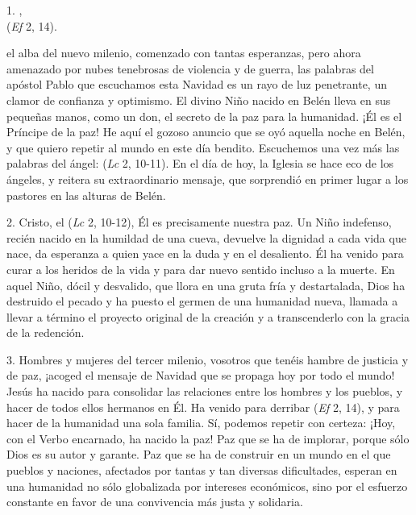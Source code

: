\begin{body}
	1. ,\\  (\emph{Ef} 2, 14).
	
	 el alba del nuevo milenio, comenzado con tantas esperanzas, pero ahora amenazado por nubes tenebrosas de violencia y de guerra, las palabras del apóstol Pablo que escuchamos esta Navidad es un rayo de luz penetrante, un clamor de confianza y optimismo. El divino Niño nacido en Belén lleva en sus pequeñas manos, como un don, el secreto de la paz para la humanidad. ¡Él es el Príncipe de la paz! He aquí el gozoso anuncio que se oyó aquella noche en Belén, y que quiero repetir al mundo en este día bendito. Escuchemos una vez más las palabras del ángel:  (\emph{Lc} 2, 10-11). En el día de hoy, la Iglesia se hace eco de los ángeles, y reitera su extraordinario mensaje, que sorprendió en primer lugar a los pastores en las alturas de Belén.
	
	2.  Cristo, el  (\emph{Lc} 2, 10-12), Él es precisamente nuestra paz. Un Niño indefenso, recién nacido en la humildad de una cueva, devuelve la dignidad a cada vida que nace, da esperanza a quien yace en la duda y en el desaliento. Él ha venido para curar a los heridos de la vida y para dar nuevo sentido incluso a la muerte. En aquel Niño, dócil y desvalido, que llora en una gruta fría y destartalada, Dios ha destruido el pecado y ha puesto el germen de una humanidad nueva, llamada a llevar a término el proyecto original de la creación y a transcenderlo con la gracia de la redención.
	
	3.  Hombres y mujeres del tercer milenio, vosotros que tenéis hambre de justicia y de paz, ¡acoged el mensaje de Navidad que se propaga hoy por todo el mundo! Jesús ha nacido para consolidar las relaciones entre los hombres y los pueblos, y hacer de todos ellos hermanos en Él. Ha venido para derribar  (\emph{Ef} 2, 14), y para hacer de la humanidad una sola familia. Sí, podemos repetir con certeza: ¡Hoy, con el Verbo encarnado, ha nacido la paz! Paz que se ha de implorar, porque sólo Dios es su autor y garante. Paz que se ha de construir en un mundo en el que pueblos y naciones, afectados por tantas y tan diversas dificultades, esperan en una humanidad no sólo globalizada por intereses económicos, sino por el esfuerzo constante en favor de una convivencia más justa y solidaria.
	

\end{body}
